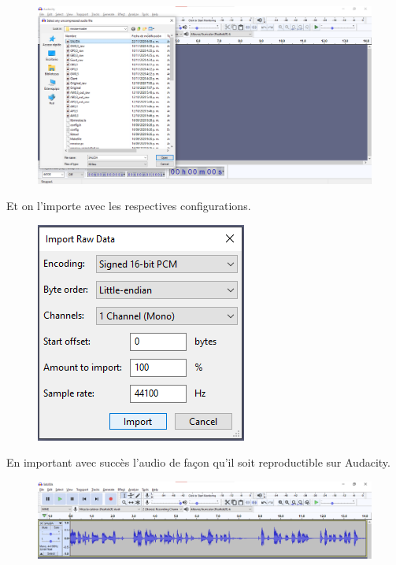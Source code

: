 \documentclass[conference,onecolumn]{IEEEtran}
\begin{document}
 \begin{figure}[H]
 \centering
    \includegraphics[scale=0.45]{VM8.png}
\end{figure}
Et on l’importe avec les respectives configurations. 
 \begin{figure}[H]
 \centering
    \includegraphics[scale=0.6]{VM9.png}
\end{figure}

En important avec succès l’audio de façon qu’il soit reproductible sur Audacity.

 \begin{figure}[H]
 \centering
    \includegraphics[scale=0.4]{VM10.png}
\end{figure}
\end{document}
